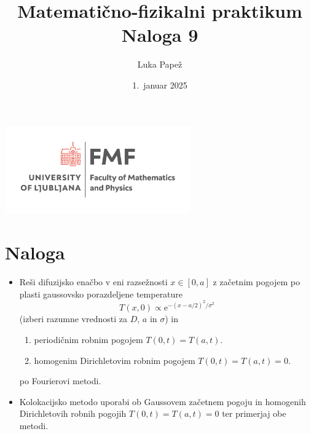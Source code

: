 \documentclass{article}
\begin{document}
\title{Matematično-fizikalni praktikum \\[3mm] \large Naloga 9}
\author{Luka Papež}
\date{1.\ januar 2025}

\begin{center}
    \includegraphics[width=8cm]{logo-fmf.png}
\end{center}

{
    \let\newpage\relax
    \maketitle
}

\maketitle
\newpage
\section{Naloga}
\begin{itemize}
  \item Reši difuzijsko enačbo v eni razsežnosti $x\in [0,a]$
z začetnim pogojem po plasti gaussovsko porazdeljene temperature
\begin{equation*}
  T(x,0) \propto \mathrm{e}^{-(x-a/2)^2 / \sigma^2}
\end{equation*}
(izberi razumne vrednosti za $D$, $a$ in $\sigma$)
in
\begin{enumerate}
 \item periodičnim robnim pogojem $T(0,t) = T(a,t)$.
 \item homogenim Dirichletovim robnim pogojem $T(0,t) = T(a,t)=0$.
\end{enumerate}
po Fourierovi metodi.
\item Kolokacijsko metodo uporabi ob Gaussovem začetnem pogoju
in homogenih Dirichletovih robnih pogojih $T(0,t)=T(a,t)=0$ ter primerjaj obe metodi.
\end{itemize}
\end{document}
